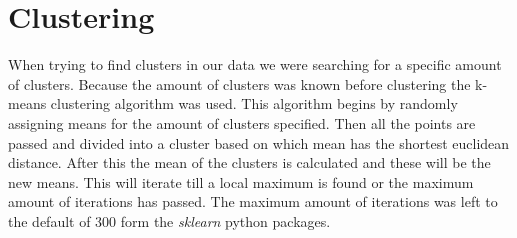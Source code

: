 \section{Clustering}
When trying to find clusters in our data we were searching for a specific amount of clusters. Because the amount of clusters was known before clustering the k-means clustering algorithm was used. This algorithm begins by randomly assigning means for the amount of clusters specified. Then all the points are passed and divided into a cluster based on which mean has the shortest euclidean distance. After this the mean of the clusters is calculated and these will be the new means. This will iterate till a local maximum is found or the maximum amount of iterations has passed. The maximum amount of iterations was left to the default of 300 form the \textit{sklearn} python packages.
